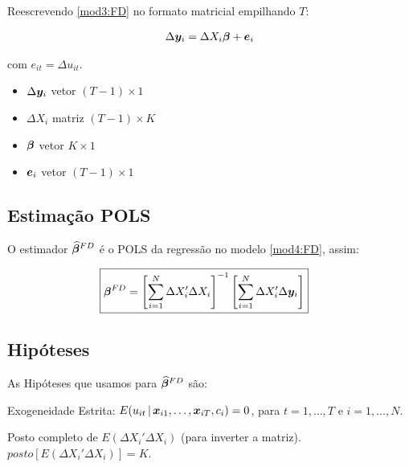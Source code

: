 \documentclass[11pt,oneside,a4paper]{article}
\numberwithin{equation}{section}
\begin{document}
\begin{description}
Reescrevendo \eqref{mod3:FD} no formato matricial empilhando $T$:

\vspace{-1 em}
\begin{align} \label{mod4:FD}
	\Delta \boldsymbol{y}_{i} = \Delta X_{i} \boldsymbol{\beta} + \boldsymbol{e}_{i}
\end{align}

\noindent
com 
$\boxed{e_{it} = \Delta u_{it}}$.

\begin{itemize}\itemsep0pt
\item
$\Delta \boldsymbol{y}_{i}$ vetor $( T - 1 ) \times 1$ 
\item
$\Delta X_{i}$  matriz  $( T - 1 ) \times K$
\item
$\boldsymbol{\beta}$ vetor $K \times 1$
\item
$\boldsymbol{e}_{i}$ vetor $(T - 1 ) \times 1$
\end{itemize}


\subsection*{Estimação POLS}

O estimador $\widehat{\boldsymbol{\beta}}^{FD}$ é o POLS da regressão no modelo \eqref{mod4:FD}, assim:

\vspace{-1 em}
\begin{align} \label{beta:pols:FD}
\Aboxed{
\mbs{\beta}^{FD} =
\left[ \sum_{i=1}^{N} \Delta X_{i}' \Delta X_{i} \right]^{-1}
\left[ \sum_{i=1}^{N} \Delta X_{i}' \Delta \mbs{y}_{i} \right]
}
\end{align}

\subsection*{Hipóteses}

As Hipóteses que usamos para $\boldsymbol{\widehat{\beta}}^{FD}$ são:

\begin{description}
\setlength\itemsep{.5 em}

\item [FD.1:] Exogeneidade Estrita:
$E( u _{it} \, | \, \boldsymbol{x}_{i1}, \dots, \boldsymbol{x}_{iT}, c_{i}) = 0$, para $t=1, \dots, T$ e $i = 1, \dots, N$.

\item  [FD.2:] Posto completo de $E( \Delta X_{i}' \Delta X_{i} )$ (para inverter a matriz).
$posto[ E( \Delta X_{i} ' \Delta X_{i} ) ]  = K$.


\end{description}
\end{description}
\end{document}
